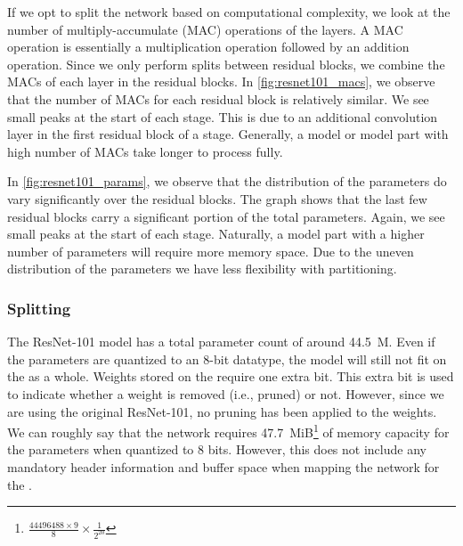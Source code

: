 If we opt to split the network based on computational complexity, we look at the number of multiply-accumulate (MAC) operations of the layers.
A MAC operation is essentially a multiplication operation followed by an addition operation.
Since we only perform splits between residual blocks, we combine the MACs of each layer in the residual blocks.
In \cref{fig:resnet101_macs}, we observe that the number of MACs for each residual block is relatively similar.
We see small peaks at the start of each stage.
This is due to an additional convolution layer in the first residual block of a stage.
Generally, a model or model part with high number of MACs take longer to process fully.

In \cref{fig:resnet101_params}, we observe that the distribution of the parameters do vary significantly over the residual blocks.
The graph shows that the last few residual blocks carry a significant portion of the total parameters.
Again, we see small peaks at the start of each stage.
Naturally, a model part with a higher number of parameters will require more memory space.
Due to the uneven distribution of the parameters we have less flexibility with partitioning. 

\subsubsection{Splitting}
The ResNet-101 model has a total parameter count of around \SI{44.5}{M}.
Even if the parameters are quantized to an 8-bit datatype, the model will still not fit on the \graicore{} as a whole.
Weights stored on the \graicore{} require one extra bit.
This extra bit is used to indicate whether a weight is removed (i.e., pruned) or not.
However, since we are using the original ResNet-101, no pruning has been applied to the weights.
We can roughly say that the network requires \SI{47.7}{MiB}\footnote{$\frac{\num{44496488} \times 9}{8} \times \frac{1}{2^{20}}$} of memory capacity for the parameters when quantized to 8 bits.
However, this does not include any mandatory header information and buffer space when mapping the network for the \graicore{}. 

